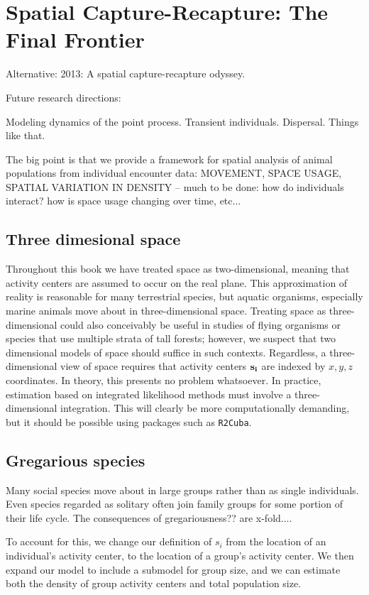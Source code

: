 


\chapter{Spatial Capture-Recapture: The Final Frontier}

\label{chapt.final}

\vspace{0.3cm}

Alternative: 2013: A spatial capture-recapture odyssey. 

Future research directions:

 Modeling dynamics of the point process. Transient individuals. 
 Dispersal. Things like that.

The big point is that we provide a framework for spatial analysis of animal populations from
individual encounter data:
MOVEMENT, SPACE USAGE, SPATIAL VARIATION IN DENSITY -- 
much to be done: how do individuals interact? how is space usage changing over time, etc...





\section{Three dimesional space}

Throughout this book we have treated space as
two-dimensional, meaning that activity centers are assumed to occur on
the real plane. This approximation of reality is reasonable for many
terrestrial species, but aquatic organisms, especially marine animals
move about in three-dimensional space. Treating space as
three-dimensional could also conceivably be useful in studies of flying organisms
or species that use multiple strata of tall forests; however, we
suspect that two dimensional models of space should suffice in such
contexts. Regardless, a three-dimensional view of space requires that
activity centers $\bf s_i$ are indexed by
$x,y,z$ coordinates. In theory, this presents no problem whatsoever. In
practice, estimation based on integrated likelihood methods must
involve a three-dimensional integration. This will clearly be more
computationally demanding, but it should be possible using packages
such as {\tt R2Cuba}.




\section{Gregarious species}

Many social species move about in large groups rather than as single
individuals. Even species regarded as solitary often join family
groups for some portion of their life cycle. The consequences of
gregariousness?? are x-fold....

To account for this, we change our definition of $s_i$ from the
location of an individual's activity center, to the location of a
group's activity center. We then expand our model to include a
submodel for group size, and we can estimate both the density of group
activity centers and total population size.
